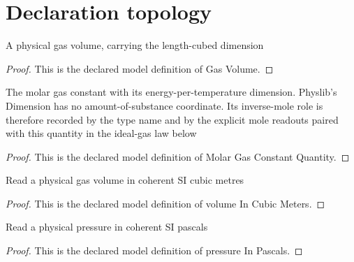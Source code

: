 \section{Declaration topology}
\begin{definition}
  \label{def:physics:phyx-mini-0400:phyxminiproblems-problemphyxmini0400-gasvolume}
  A physical gas volume, carrying the length-cubed dimension
\end{definition}
\begin{proof}
  This is the declared model definition of Gas Volume.
\end{proof}
\begin{definition}
  \label{def:physics:phyx-mini-0400:phyxminiproblems-problemphyxmini0400-molargasconstantquantity}
  The molar gas constant with its energy-per-temperature dimension. Physlib's Dimension has no amount-of-substance coordinate. Its inverse-mole role is therefore recorded by the type name and by the explicit mole readouts paired with this quantity in the ideal-gas law below
\end{definition}
\begin{proof}
  This is the declared model definition of Molar Gas Constant Quantity.
\end{proof}
\begin{definition}
  \label{def:physics:phyx-mini-0400:phyxminiproblems-problemphyxmini0400-volumeincubicmeters}
  Read a physical gas volume in coherent SI cubic metres
\end{definition}
\begin{proof}
  This is the declared model definition of volume In Cubic Meters.
\end{proof}
\begin{definition}
  \label{def:physics:phyx-mini-0400:phyxminiproblems-problemphyxmini0400-pressureinpascals}
  Read a physical pressure in coherent SI pascals
\end{definition}
\begin{proof}
  This is the declared model definition of pressure In Pascals.
\end{proof}
